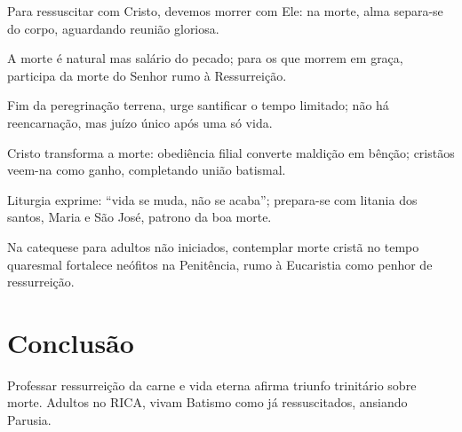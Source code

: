 Para ressuscitar com Cristo, devemos morrer com Ele: na morte, alma separa-se do corpo, aguardando reunião gloriosa.

A morte é natural mas salário do pecado; para os que morrem em graça, participa da morte do Senhor rumo à Ressurreição.

Fim da peregrinação terrena, urge santificar o tempo limitado; não há reencarnação, mas juízo único após uma só vida.

Cristo transforma a morte: obediência filial converte maldição em bênção; cristãos veem-na como ganho, completando união batismal.

Liturgia exprime: ``vida se muda, não se acaba''; prepara-se com litania dos santos, Maria e São José, patrono da boa morte.

Na catequese para adultos não iniciados, contemplar morte cristã no tempo quaresmal fortalece neófitos na Penitência, rumo à Eucaristia como penhor de ressurreição.

\section{Conclusão}

Professar ressurreição da carne e vida eterna afirma triunfo trinitário sobre morte. Adultos no RICA, vivam Batismo como já ressuscitados, ansiando Parusia.